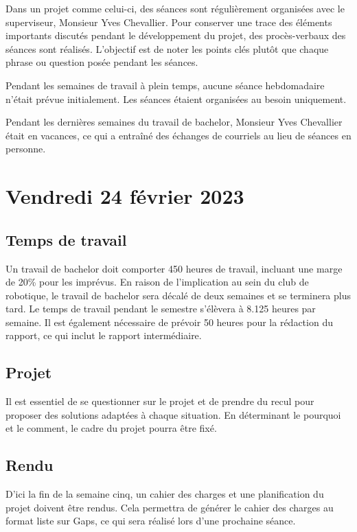 Dans un projet comme celui-ci, des séances sont régulièrement organisées avec le superviseur, Monsieur Yves Chevallier.
Pour conserver une trace des éléments importants discutés pendant le développement du projet, des procès-verbaux des séances sont réalisés.
L'objectif est de noter les points clés plutôt que chaque phrase ou question posée pendant les séances.

Pendant les semaines de travail à plein temps, aucune séance hebdomadaire n'était prévue initialement.
Les séances étaient organisées au besoin uniquement.

Pendant les dernières semaines du travail de bachelor, Monsieur Yves Chevallier était en vacances, ce qui a entraîné des échanges de courriels au lieu de séances en personne.

\section{Vendredi 24 février 2023}

\subsection{Temps de travail}

Un travail de bachelor doit comporter 450 heures de travail, incluant une marge de 20\% pour les imprévus.
En raison de l'implication au sein du club de robotique, le travail de bachelor sera décalé de deux semaines et se terminera plus tard.
Le temps de travail pendant le semestre s'élèvera à 8.125 heures par semaine.
Il est également nécessaire de prévoir 50 heures pour la rédaction du rapport, ce qui inclut le rapport intermédiaire.

\subsection{Projet}

Il est essentiel de se questionner sur le projet et de prendre du recul pour proposer des solutions adaptées à chaque situation.
En déterminant le pourquoi et le comment, le cadre du projet pourra être fixé.

\subsection{Rendu}

D'ici la fin de la semaine cinq, un cahier des charges et une planification du projet doivent être rendus.
Cela permettra de générer le cahier des charges au format liste sur Gaps, ce qui sera réalisé lors d'une prochaine séance.

